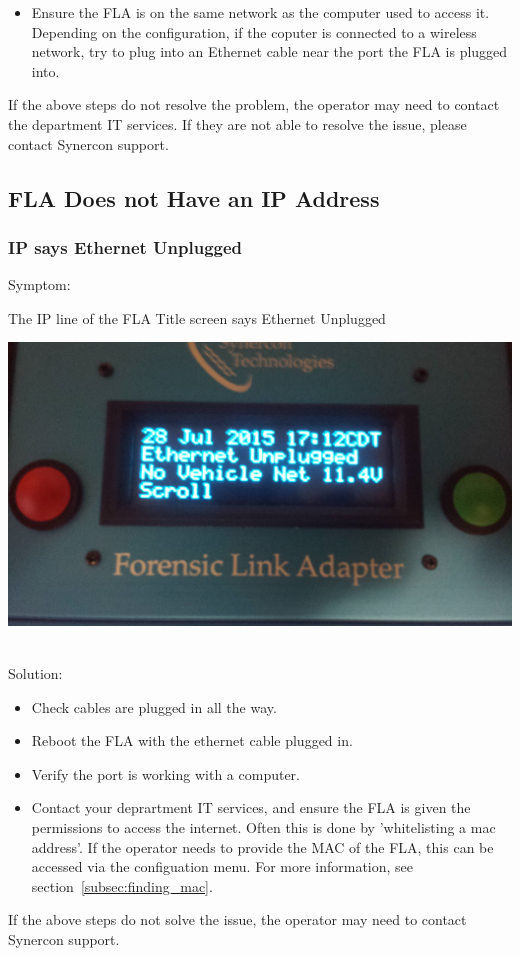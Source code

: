 \documentclass[11pt]{article}
\begin{document}
\begin{itemize}
\item Ensure the FLA is on the same network as the computer used to access it. Depending on the configuration, if the coputer is connected to a wireless network, try to plug into an Ethernet cable near the port the FLA is plugged into.
\end{itemize}
If the above steps do not resolve the problem, the operator may need to contact the department IT services. If they are not able to resolve the issue, please contact Synercon support.

\subsection{FLA Does not Have an IP Address}
\subsubsection{IP says Ethernet Unplugged}
Symptom:\\
\noindent\begin{minipage}{0.45\textwidth}%
The IP line of the FLA Title screen says Ethernet Unplugged
\end{minipage}%
\hfill%
\begin{minipage}{0.45\textwidth}
\includegraphics[width=\linewidth]{../media/fla_screens/title_screen_eth_unplug}
\end{minipage}\\
Solution:\\
\begin{itemize}
\item Check cables are plugged in all the way.
\item Reboot the FLA with the ethernet cable plugged in.
\item Verify the port is working with a computer.
\item Contact your deprartment IT services, and ensure the FLA is given the permissions to access the internet. Often this is done by 'whitelisting a mac address'. If the operator needs to provide the MAC of the FLA, this can be accessed via the configuation menu. For more information, see section~\ref{subsec:finding_mac}.
\end{itemize}
If the above steps do not solve the issue, the operator may need to contact Synercon support.
\end{document}
